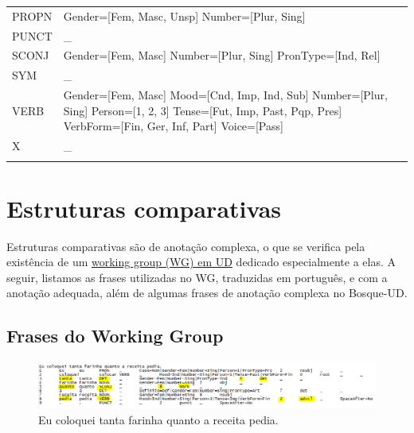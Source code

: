 \documentclass[output=paper,colorlinks,citecolor=brown]{langscibook}
\begin{document}
\begin{longtable}{ p{1.5cm} | p{10cm} }
PROPN & Gender=[Fem, Masc, Unsp] \newline Number=[Plur, Sing] \newline \\
PUNCT & \_ \newline\\
SCONJ & Gender=[Fem, Masc] \newline Number=[Plur, Sing] \newline PronType=[Ind, Rel] \newline \\
SYM & \_ \newline\\
VERB & Gender=[Fem, Masc] \newline Mood=[Cnd, Imp, Ind, Sub] \newline Number=[Plur, Sing] \newline Person=[1, 2, 3] \newline Tense=[Fut, Imp, Past, Pqp, Pres] \newline VerbForm=[Fin, Ger, Inf, Part] \newline Voice=[Pass] \newline \\
X & \_ \\

\label{tab:feats}
\end{longtable}

\section{Estruturas comparativas}

Estruturas comparativas são de anotação complexa, o que se verifica pela existência de um \href{https://universaldependencies.org/workgroups/comparatives.html}{working group (WG) em UD} dedicado especialmente a elas. A seguir, listamos as frases utilizadas no WG, traduzidas em português, e com a anotação adequada, além de algumas frases de anotação complexa no Bosque-UD.

\subsection{Frases do Working Group}

\begin{figure}
    \centering
    \includegraphics[width=\textwidth,height=\textheight,keepaspectratio]{imagesDrive/image20.png}
    \caption{Eu coloquei tanta farinha quanto a receita pedia.}
    \label{fig:comparative1}
    \end{figure}{}
\end{document}
